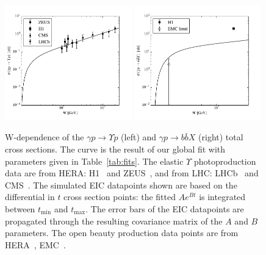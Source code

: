 \documentclass[10pt,prd,aps,nofootinbib,superscriptaddress]{revtex4}
\begin{document}
\begin{figure}
\includegraphics[width=0.49\textwidth]{si_y.pdf}
\includegraphics[width=0.49\textwidth]{si_bbX.pdf}
\caption{W-dependence of the $\gamma p \to \Upsilon p$ (left) and $\gamma p \to b \bar b X$ (right) total cross sections.
The curve is the result of our global fit with parameters given in Table~\ref{tab:fits}.
The elastic $\Upsilon$ photoproduction data are from HERA: H1~\cite{Adloff:2000vm}
and ZEUS~\cite{Breitweg:1998ki, Chekanov:2009zz}, and from LHC: LHCb~\cite{Aaij:2015kea} 
and CMS~\cite{Sirunyan:2018sav}. 
The simulated EIC datapoints shown are based on the differential in $t$ cross section points:
the fitted $Ae^{Bt}$ is integrated between $t_\mathrm{min}$ and $t_\mathrm{max}$.
The error bars of the EIC datapoints are propagated through the resulting covariance matrix of the $A$ and $B$ parameters.
The open beauty production data points are from HERA~\cite{Adloff:1999nr}, EMC~\cite{Aubert:1981gx}.}
\label{fig:sigmatot}
\end{figure}
\end{document}
